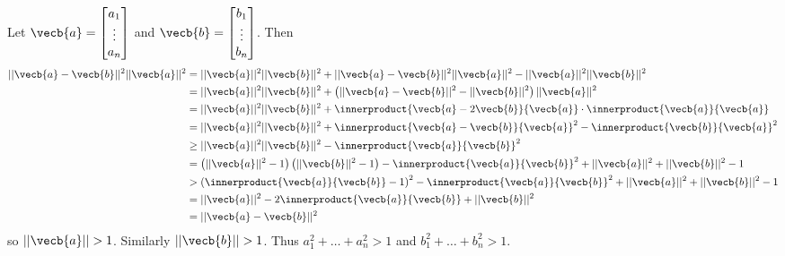 Let $\vecb{a}=\begin{bmatrix} a_1 \\ \vdots \\ a_n \end{bmatrix}$ and $\vecb{b}=\begin{bmatrix} b_1 \\ \vdots \\ b_n \end{bmatrix}$. Then
\begin{align*}
	||\vecb{a}-\vecb{b}||^2||\vecb{a}||^2&=||\vecb{a}||^2||\vecb{b}||^2+||\vecb{a}-\vecb{b}||^2||\vecb{a}||^2-||\vecb{a}||^2||\vecb{b}||^2\\
	&=||\vecb{a}||^2||\vecb{b}||^2+\left(||\vecb{a}-\vecb{b}||^2-||\vecb{b}||^2\right)||\vecb{a}||^2\\
	&=||\vecb{a}||^2||\vecb{b}||^2+\innerproduct{\vecb{a}-2\vecb{b}}{\vecb{a}}\cdot\innerproduct{\vecb{a}}{\vecb{a}}\\
	&=||\vecb{a}||^2||\vecb{b}||^2+\innerproduct{\vecb{a}-\vecb{b}}{\vecb{a}}^2-\innerproduct{\vecb{b}}{\vecb{a}}^2\\
	&\geq||\vecb{a}||^2||\vecb{b}||^2-\innerproduct{\vecb{a}}{\vecb{b}}^2\\
	&=\left(||\vecb{a}||^2-1\right)\left(||\vecb{b}||^2-1\right)-\innerproduct{\vecb{a}}{\vecb{b}}^2+||\vecb{a}||^2+||\vecb{b}||^2-1\\
	&>\left(\innerproduct{\vecb{a}}{\vecb{b}}-1\right)^2-\innerproduct{\vecb{a}}{\vecb{b}}^2+||\vecb{a}||^2+||\vecb{b}||^2-1\\
	&=||\vecb{a}||^2-2\innerproduct{\vecb{a}}{\vecb{b}}+||\vecb{b}||^2\\
	&=||\vecb{a}-\vecb{b}||^2
\end{align*}
so $||\vecb{a}||>1$. Similarly $||\vecb{b}||>1$. Thus $a_1^2+\ldots+a_n^2>1$ and $b_1^2+\ldots+b_n^2>1$.